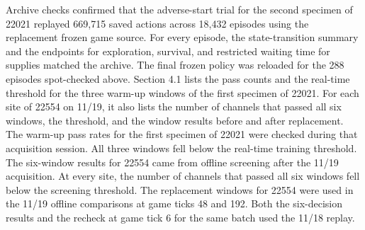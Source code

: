 \documentclass{article}
\begin{document}
Archive checks confirmed that the adverse-start trial for the second specimen of 22021 replayed 669,715 saved actions across 18,432 episodes using the replacement frozen game source. For every episode, the state-transition summary and the endpoints for exploration, survival, and restricted waiting time for supplies matched the archive. The final frozen policy was reloaded for the 288 episodes spot-checked above. Section 4.1 lists the pass counts and the real-time threshold for the three warm-up windows of the first specimen of 22021. For each site of 22554 on 11/19, it also lists the number of channels that passed all six windows, the threshold, and the window results before and after replacement. The warm-up pass rates for the first specimen of 22021 were checked during that acquisition session. All three windows fell below the real-time training threshold. The six-window results for 22554 came from offline screening after the 11/19 acquisition. At every site, the number of channels that passed all six windows fell below the screening threshold. The replacement windows for 22554 were used in the 11/19 offline comparisons at game ticks 48 and 192. Both the six-decision results and the recheck at game tick 6 for the same batch used the 11/18 replay.
\end{document}
